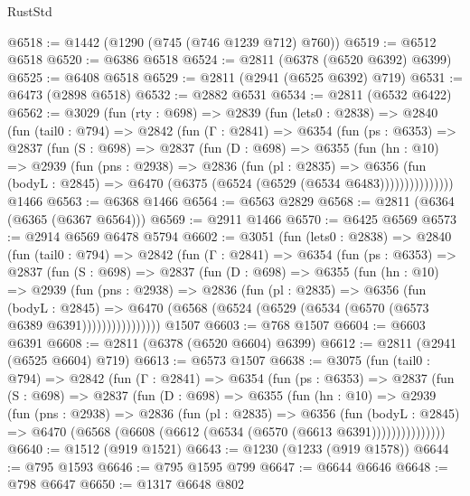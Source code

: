 \begin{lexlean}{RustStd}
\begin{coremodule}
{\begin{coremodule}
{{{{{{{{{{{{{{{@6518 := @1442 (@1290 (@745 (@746 @1239 @712) @760))
@6519 := @6512 @6518
@6520 := @6386 @6518
@6524 := @2811 (@6378 (@6520 @6392) @6399)
@6525 := @6408 @6518
@6529 := @2811 (@2941 (@6525 @6392) @719)
@6531 := @6473 (@2898 @6518)
@6532 := @2882 @6531
@6534 := @2811 (@6532 @6422)
@6562 := @3029
    (fun (rty : @698) =>
    @2839
      (fun (lets0 : @2838) =>
      @2840
        (fun (tail0 : @794) =>
        @2842
          (fun (Γ : @2841) =>
          @6354
            (fun (ps : @6353) =>
            @2837
              (fun (S : @698) =>
              @2837
                (fun (D : @698) =>
                @6355
                  (fun (hn : @10) =>
                  @2939
                    (fun (pns : @2938) =>
                    @2836
                      (fun (pl : @2835) =>
                      @6356
                        (fun (bodyL : @2845) =>
                        @6470 (@6375 (@6524 (@6529 (@6534 @6483)))))))))))))))
    @1466
@6563 := @6368 @1466
@6564 := @6563 @2829
@6568 := @2811 (@6364 (@6365 (@6367 @6564)))
@6569 := @2911 @1466
@6570 := @6425 @6569
@6573 := @2914 @6569 @6478 @5794
@6602 := @3051
    (fun (lets0 : @2838) =>
    @2840
      (fun (tail0 : @794) =>
      @2842
        (fun (Γ : @2841) =>
        @6354
          (fun (ps : @6353) =>
          @2837
            (fun (S : @698) =>
            @2837
              (fun (D : @698) =>
              @6355
                (fun (hn : @10) =>
                @2939
                  (fun (pns : @2938) =>
                  @2836
                    (fun (pl : @2835) =>
                    @6356
                      (fun (bodyL : @2845) =>
                      @6470 (@6568 (@6524 (@6529 (@6534 (@6570 (@6573 @6389 @6391))))))))))))))))
    @1507
@6603 := @768 @1507
@6604 := @6603 @6391
@6608 := @2811 (@6378 (@6520 @6604) @6399)
@6612 := @2811 (@2941 (@6525 @6604) @719)
@6613 := @6573 @1507
@6638 := @3075
    (fun (tail0 : @794) =>
    @2842
      (fun (Γ : @2841) =>
      @6354
        (fun (ps : @6353) =>
        @2837
          (fun (S : @698) =>
          @2837
            (fun (D : @698) =>
            @6355
              (fun (hn : @10) =>
              @2939
                (fun (pns : @2938) =>
                @2836
                  (fun (pl : @2835) =>
                  @6356
                    (fun (bodyL : @2845) =>
                    @6470 (@6568 (@6608 (@6612 (@6534 (@6570 (@6613 @6391)))))))))))))))
@6640 := @1512 (@919 @1521)
@6643 := @1230 (@1233 (@919 @1578))
@6644 := @795 @1593
@6646 := @795 @1595 @799
@6647 := @6644 @6646
@6648 := @798 @6647
@6650 := @1317 @6648 @802
}}}}}}}}}}}}}}}
\end{coremodule}}
\end{coremodule}
\end{lexlean}
